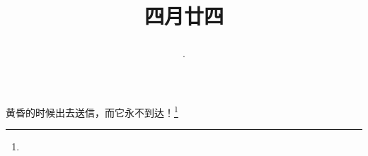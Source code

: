 \title{\date[d=31,m=5,y=2024][year:cn-y,年,month:cn,day:cn,日,·,weekday]·四月廿四 }
黄昏的时候出去送信，而它永不到达！\footnote{ }

